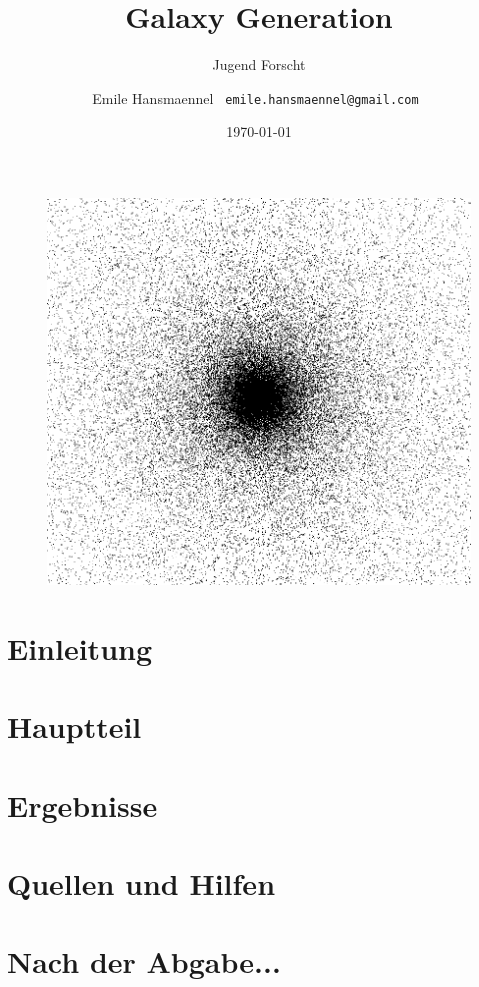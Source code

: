 \documentclass[a4paper,10pt]{scrartcl}
\begin{document}
\title{Galaxy Generation}
\subtitle{Jugend Forscht \the\year}
\author{ Emile Hansmaennel \texttt{ emile.hansmaennel@gmail.com }}
\date{\today}

\maketitle

\begin{figure}[h]
  \centering
  \includegraphics[width=120mm, trim={0 8.5cm 0 8.5cm}, clip]{figs/galaxy}
  \captionsetup{labelformat=empty}
  \caption{}
 \end{figure}

\begin{abstract}

\end{abstract}

\thispagestyle{empty}
\clearpage
\newpage
\setcounter{page}{1}

\tableofcontents
\newpage

\section{Einleitung} \label{Einleitung}

\newpage

\section{Hauptteil} \label{Hauptteil}

\newpage

\section{Ergebnisse} \label{ergebnisse}

\newpage

\section{Quellen und Hilfen} \label{quellen}

\newpage

\section{Nach der Abgabe...} \label{nach_der_abgabe}

\end{document}
